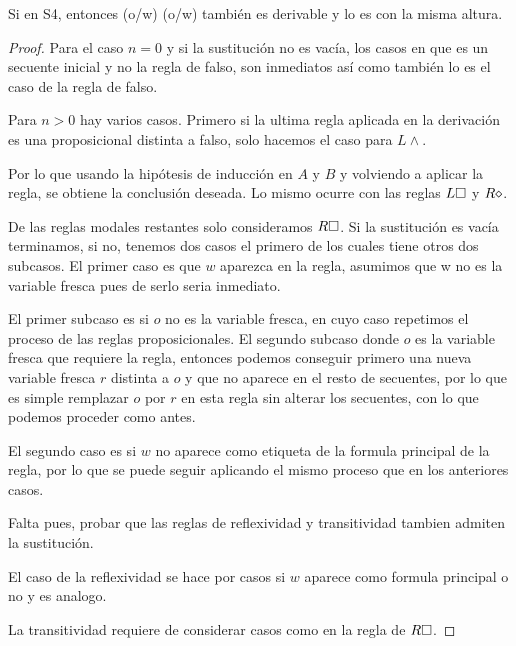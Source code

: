 \begin{teo}
  Si \Gamma \derives \Delta en S4, entonces \Gamma(o/w) \derives \Delta(o/w) también es derivable y lo es con la misma altura.
\end{teo}
\begin{proof}
  Para el caso $n=0$ y si la sustitución no es vacía, los casos en que es un secuente inicial y no la regla de falso, son inmediatos así como también lo es el caso de la regla de falso.
  
  Para $n>0$ hay varios casos.  Primero si la ultima regla aplicada en la derivación es una proposicional distinta a falso, solo hacemos el caso para $L \land$.
  

  Por lo que usando la hipótesis de inducción en $A$ y $B$ y volviendo a aplicar la regla, se obtiene la conclusión deseada. Lo mismo ocurre con las reglas $L\square$ y $R\diamond$. 

  De las reglas modales restantes solo consideramos $R\square$. Si la sustitución es vacía terminamos, si no, tenemos dos casos el primero de los cuales tiene otros dos subcasos. El primer caso es que $w$ aparezca en la regla, asumimos que w no es la variable fresca pues de serlo seria inmediato.

  El primer subcaso es si $o$ no es la variable fresca, en cuyo caso repetimos el proceso de las reglas proposicionales. El segundo subcaso donde $o$ es la variable fresca que requiere la regla, entonces podemos conseguir primero una nueva variable fresca $r$ distinta a $o$ y que no aparece en el resto de secuentes, por lo que es simple remplazar $o$ por $r$ en esta regla sin alterar los secuentes, con lo que podemos proceder como antes. 

  El segundo caso es si $w$ no aparece como etiqueta de la formula principal de la regla, por lo que se puede seguir aplicando el mismo proceso que en los anteriores casos.

  Falta pues, probar que las reglas de reflexividad y transitividad tambien admiten la sustitución. 

  El caso de la reflexividad se hace por casos si $w$ aparece como formula principal o no y es analogo.


  La transitividad requiere de considerar casos como en la regla de $R\square$.
\end{proof}

